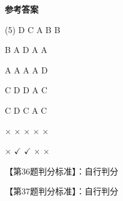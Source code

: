 \documentclass[11pt, a4paper]{article}
\begin{document}
\begin{center}
    \Huge \textbf{参考答案}
\end{center}

    \begin{tasks}[label=\arabic*. , label-width=14pt](5)
        \task D
        \task C
        \task A
        \task B
        \task B

        \task B
        \task A
        \task D
        \task A
        \task A

        \task A
        \task A
        \task A
        \task A
        \task D

        \task C
        \task D
        \task D
        \task A
        \task C

        \task C
        \task D
        \task C
        \task A
        \task C

        \task $\times$
        \task $\times$
        \task $\times$
        \task $\times$
        \task $\times$

        \task $\times$
        \task $\checkmark$
        \task $\checkmark$
        \task $\times$
        \task $\times$
    \end{tasks}

    【第36题判分标准】：自行判分

    【第37题判分标准】：自行判分
\end{document}
